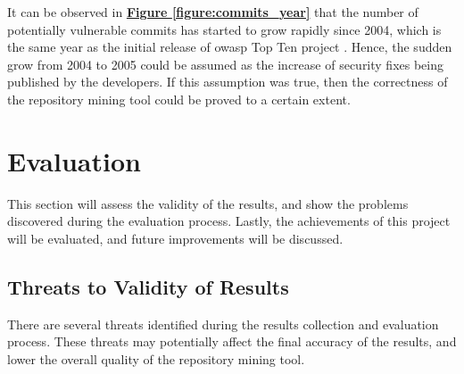 \documentclass[12pt, a4paper]{report}
\begin{document}
It can be observed in \hyperref[figure:commits_year]{\textbf{Figure \ref*{figure:commits_year}}}
that the number of potentially vulnerable commits has started to grow rapidly since 2004, which is
the same year as the initial release of \acrshort{owasp} Top Ten project \cite{owasp_top10_2004}.
Hence, the sudden grow from 2004 to 2005 could be assumed as the increase of security fixes being
published by the developers. If this assumption was true, then the correctness of the repository
mining tool could be proved to a certain extent.

\section{Evaluation} \label{sec:evaluation}
This section will assess the validity of the results, and show the problems discovered during the
evaluation process. Lastly, the achievements of this project will be evaluated, and future
improvements will be discussed.

\subsection{Threats to Validity of Results} \label{subsec:threats_to_validity}
There are several threats identified during the results collection and evaluation process. These
threats may potentially affect the final accuracy of the results, and lower the overall quality of
the repository mining tool.
\end{document}

